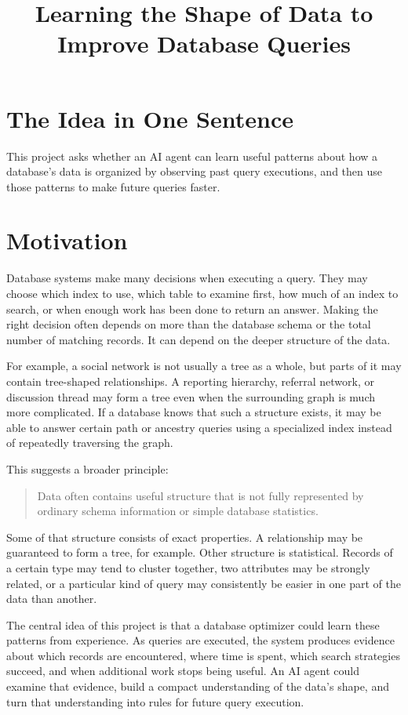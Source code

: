 \documentclass[11pt]{article}
\title{Learning the Shape of Data to Improve Database Queries}
\author{}
\date{}
\begin{document}
\maketitle

\section{The Idea in One Sentence}

This project asks whether an AI agent can learn useful patterns about how a database's data is organized by observing past query executions, and then use those patterns to make future queries faster.

\section{Motivation}

Database systems make many decisions when executing a query. They may choose which index to use, which table to examine first, how much of an index to search, or when enough work has been done to return an answer. Making the right decision often depends on more than the database schema or the total number of matching records. It can depend on the deeper structure of the data.

For example, a social network is not usually a tree as a whole, but parts of it may contain tree-shaped relationships. A reporting hierarchy, referral network, or discussion thread may form a tree even when the surrounding graph is much more complicated. If a database knows that such a structure exists, it may be able to answer certain path or ancestry queries using a specialized index instead of repeatedly traversing the graph.

This suggests a broader principle:

\begin{quote}
Data often contains useful structure that is not fully represented by ordinary schema information or simple database statistics.
\end{quote}

Some of that structure consists of exact properties. A relationship may be guaranteed to form a tree, for example. Other structure is statistical. Records of a certain type may tend to cluster together, two attributes may be strongly related, or a particular kind of query may consistently be easier in one part of the data than another.

The central idea of this project is that a database optimizer could learn these patterns from experience. As queries are executed, the system produces evidence about which records are encountered, where time is spent, which search strategies succeed, and when additional work stops being useful. An AI agent could examine that evidence, build a compact understanding of the data's shape, and turn that understanding into rules for future query execution.
\end{document}
